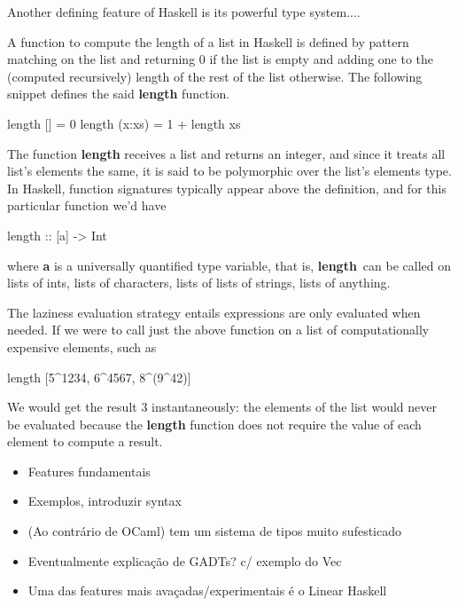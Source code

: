 \documentclass[]{lwnovathesis}
\begin{document}
Another defining feature of Haskell is its powerful type system....



A function to compute the length of a list in Haskell is defined by pattern
matching on the list and returning $0$ if the list is empty and adding one to
the (computed recursively) length of the rest of the list otherwise. The
following snippet defines the said \textbf{length} function.
\begin{code}
    length [] = 0
    length (x:xs) = 1 + length xs
\end{code}
The function \textbf{length} receives a list and returns an integer, and since
it treats all list's elements the same, it is said to be polymorphic over the
list's elements type. In Haskell, function signatures typically appear above the
definition, and for this particular function we'd have
\begin{code}
    length :: [a] -> Int
\end{code}
where \textbf{a} is a universally quantified type variable, that is,
\textbf{length} can be called on lists of ints, lists of characters, lists of
lists of strings, lists of anything.

The laziness evaluation strategy entails expressions are only evaluated when
needed. If we were to call just the above function on a list of computationally
expensive elements, such as
\begin{code}
    length [5^1234, 6^4567, 8^(9^42)]
\end{code}
We would get the result 3 instantaneously: the elements of the list would never
be evaluated because the \textbf{length} function does not require the value of
each element to compute a result.



\begin{itemize}
    \item Features fundamentais
    \item Exemplos, introduzir syntax
    \item (Ao contrário de OCaml) tem um sistema de tipos muito sufesticado
    \item Eventualmente explicação de GADTs? c/ exemplo do Vec
    \item Uma das features mais avaçadas/experimentais é o Linear Haskell
\end{itemize}
\end{document}
